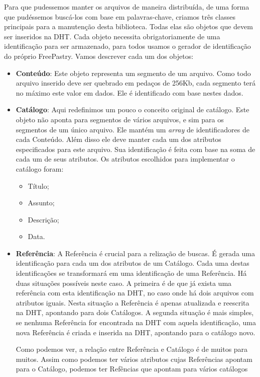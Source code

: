 \documentclass{acm_proc_article-sp}
\begin{document}
Para que pudessemos manter os arquivos  de maneira distribuída, de uma forma que pudéssemos buscá-los com base em palavras-chave, criamos três classes principais para  a manutenção desta biblioteca. Todas elas são objetos que devem ser inseridos na DHT. Cada objeto necessita obrigatoriamente de uma identificação para ser armazenado, para todos usamos o gerador de identificação do próprio FreePastry. Vamos descrever cada um dos objetos:
\begin{itemize}
 \item \textbf{Conteúdo}:
	Este objeto representa um segmento de um arquivo. Como todo arquivo inserido deve ser quebrado em pedaços de 256Kb, cada segmento terá no máximo este valor em dados. Ele é identificado com base nestes dados.
	
 \item \textbf{Catálogo}:
	Aqui redefinimos um pouco o conceito original de catálogo. Este objeto não aponta para segmentos de vários arquivos, e sim para os segmentos de um único arquivo. Ele mantém um \textit{array} de identificadores de cada Conteúdo. Além disso ele deve manter cada um dos atributos especificados para este arquivo. Sua identificação é feita com base na soma de cada um de seus atributos.
	Os atributos escolhidos para implementar o catálogo foram:
	\begin{itemize}
	 \item Título;
	 \item Assunto;
	 \item Descrição;
	 \item Data.
	\end{itemize}

	
 \item \textbf{Referência}:
	A Referência é crucial para a relização de buscas. É gerada uma identificação para cada um dos atributos de um Catálogo. Cada uma destas identificações se transformará em uma identificação de uma Referência. Há duas situações possíveis neste caso. A primeira é de que já exista uma referência com esta identificação na DHT, no caso onde há dois arquivos com atributos iguais. Nesta situação a Referência é apenas atualizada e reescrita na DHT, apontando para dois Catálogos. A segunda situação é mais simples, se nenhuma Referência for encontrada na DHT com aquela identificação, uma nova Referência é criada e inserida na DHT, apontando para o catálogo novo.
	
	Como podemos ver, a relação entre Referência e Catálogo é de muitos para muitos. Assim como podemos ter vários atributos cujas Referências apontam para o Catálogo, podemos ter Refências que apontam para vários catálogos
\end{itemize}
\end{document}
